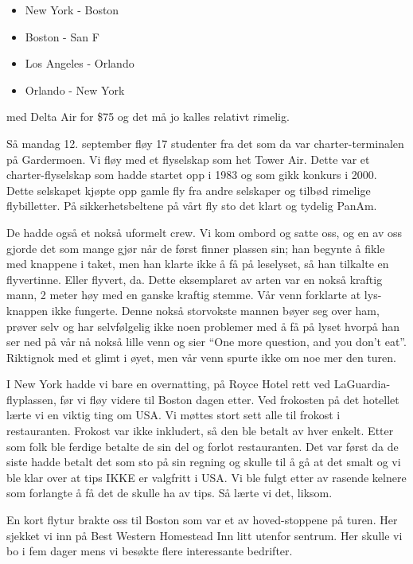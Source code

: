 \documentclass[../../main.tex]{subfiles}
\begin{document}
\begin{itemize}
	\item New York - Boston
	\item Boston - San F
	\item Los Angeles - Orlando
	\item Orlando - New York
\end{itemize}

med Delta Air for \$75 og det må jo kalles relativt rimelig. 

Så mandag 12. september fløy 17 studenter fra det som da var charter-terminalen på Gardermoen. Vi fløy med et flyselskap som het Tower Air. Dette var et charter-flyselskap som hadde startet opp i 1983 og som gikk konkurs i 2000. Dette selskapet kjøpte opp gamle fly fra andre selskaper og tilbød rimelige flybilletter. På sikkerhetsbeltene på vårt fly sto det klart og tydelig PanAm.

De hadde også et nokså uformelt crew. Vi kom ombord og satte oss, og en av oss gjorde det som mange gjør når de først finner plassen sin; han begynte å fikle med knappene i taket, men han klarte ikke å få på leselyset, så han tilkalte en flyvertinne. Eller flyvert, da. Dette eksemplaret av arten var en nokså kraftig mann, 2 meter høy med en ganske kraftig stemme. Vår venn forklarte at lys-knappen ikke fungerte. Denne nokså storvokste mannen bøyer seg over ham, prøver selv og har selvfølgelig ikke noen problemer med å få på lyset hvorpå han ser ned på vår nå nokså lille venn og sier “One more question, and you don’t eat”. Riktignok med et glimt i øyet, men vår venn spurte ikke om noe mer den turen.

I New York hadde vi bare en overnatting, på Royce Hotel rett ved LaGuardia-flyplassen, før vi fløy videre til Boston dagen etter. Ved frokosten på det hotellet lærte vi en viktig ting om USA. Vi møttes stort sett alle til frokost i restauranten. Frokost var ikke inkludert, så den ble betalt av hver enkelt. Etter som folk ble ferdige betalte de sin del og forlot restauranten. Det var først da de siste hadde betalt det som sto på sin regning og skulle til å gå at det smalt og vi ble klar over at tips IKKE er valgfritt i USA. Vi ble fulgt etter av rasende kelnere som forlangte å få det de skulle ha av tips. Så lærte vi det, liksom.

En kort flytur brakte oss til Boston som var et av hoved-stoppene på turen. Her sjekket vi inn på Best Western Homestead Inn litt utenfor sentrum. Her skulle vi bo i fem dager mens vi besøkte flere interessante bedrifter. 
\end{document}
